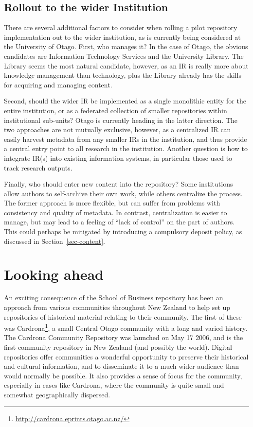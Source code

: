 \documentclass[12pt,pdftex,a4paper,titlepage]{article}
\begin{document}
\subsection{Rollout to the wider Institution}

There are several additional factors to consider when rolling a pilot repository implementation out to the wider institution, as is currently being considered at the University of Otago. First, who manages it? In the case of Otago, the obvious candidates are Information Technology Services and the University Library. The Library seems the most natural candidate, however, as an IR is really more about knowledge management than technology, plus the Library already has the skills for acquiring and managing content.

Second, should the wider IR be implemented as a single monolithic entity for the entire institution, or as a federated collection of smaller repositories within institutional sub-units? Otago is currently heading in the latter direction. The two approaches are not mutually exclusive, however, as a centralized IR can easily harvest metadata from any smaller IRs in the institution, and thus provide a central entry point to all research in the institution. Another question is how to integrate IR(s) into existing information systems, in particular those used to track research outputs.

Finally, who should enter new content into the repository? Some institutions allow authors to self-archive their own work, while others centralize the process. The former approach is more flexible, but can suffer from problems with consistency and quality of metadata. In contrast, centralization is easier to manage, but may lead to a feeling of ``lack of control'' on the part of authors. This could perhaps be mitigated by introducing a compulsory deposit policy, as discussed in Section~\ref{sec-content}.


\section{Looking ahead}

An exciting consequence of the School of Business repository has been an approach from various communities throughout New Zealand to help set up repositories of historical material relating to their community. The first of these was Cardrona\footnote{\url{http://cardrona.eprints.otago.ac.nz/}}, a small Central Otago community with a long and varied history. The Cardrona Community Repository was launched on May 17 2006, and is the first community repository in New Zealand (and possibly the world). Digital repositories offer communities a wonderful opportunity to preserve their historical and cultural information, and to disseminate it to a much wider audience than would normally be possible. It also provides a sense of focus for the community, especially in cases like Cardrona, where the community is quite small and somewhat geographically dispersed.
\end{document}
